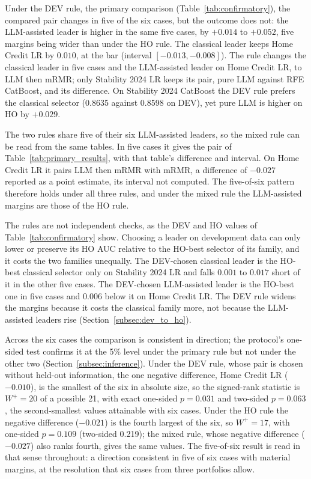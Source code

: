 \documentclass[final,5p,twocolumn]{elsarticle}
\begin{document}
Under the DEV rule, the primary comparison (Table~\ref{tab:confirmatory}), the compared pair changes in five of the six cases, but the outcome does not: the LLM-assisted leader is higher in the same five cases, by $+0.014$ to $+0.052$, five margins being wider than under the HO rule. The classical leader keeps Home Credit LR by $0.010$, at the bar (interval $[-0.013, -0.008]$). The rule changes the classical leader in five cases and the LLM-assisted leader on Home Credit LR, to LLM then mRMR; only Stability 2024 LR keeps its pair, pure LLM against RFE CatBoost, and its difference. On Stability 2024 CatBoost the DEV rule prefers the classical selector (0.8635 against 0.8598 on DEV), yet pure LLM is higher on HO by $+0.029$.

The two rules share five of their six LLM-assisted leaders, so the mixed rule can be read from the same tables. In five cases it gives the pair of Table~\ref{tab:primary_results}, with that table's difference and interval. On Home Credit LR it pairs LLM then mRMR with mRMR, a difference of $-0.027$ reported as a point estimate, its interval not computed. The five-of-six pattern therefore holds under all three rules, and under the mixed rule the LLM-assisted margins are those of the HO rule.

The rules are not independent checks, as the DEV and HO values of Table~\ref{tab:confirmatory} show. Choosing a leader on development data can only lower or preserve its HO AUC relative to the HO-best selector of its family, and it costs the two families unequally. The DEV-chosen classical leader is the HO-best classical selector only on Stability 2024 LR and falls $0.001$ to $0.017$ short of it in the other five cases. The DEV-chosen LLM-assisted leader is the HO-best one in five cases and $0.006$ below it on Home Credit LR. The DEV rule widens the margins because it costs the classical family more, not because the LLM-assisted leaders rise (Section~\ref{subsec:dev_to_ho}).

Across the six cases the comparison is consistent in direction; the protocol's one-sided test confirms it at the 5\% level under the primary rule but not under the other two (Section~\ref{subsec:inference}). Under the DEV rule, whose pair is chosen without held-out information, the one negative difference, Home Credit LR ($-0.010$), is the smallest of the six in absolute size, so the signed-rank statistic is $W^{+}=20$ of a possible 21, with exact one-sided $p=0.031$ and two-sided $p=0.063$, the second-smallest values attainable with six cases. Under the HO rule the negative difference ($-0.021$) is the fourth largest of the six, so $W^{+}=17$, with one-sided $p=0.109$ (two-sided 0.219); the mixed rule, whose negative difference ($-0.027$) also ranks fourth, gives the same values. The five-of-six result is read in that sense throughout: a direction consistent in five of six cases with material margins, at the resolution that six cases from three portfolios allow.
\end{document}
